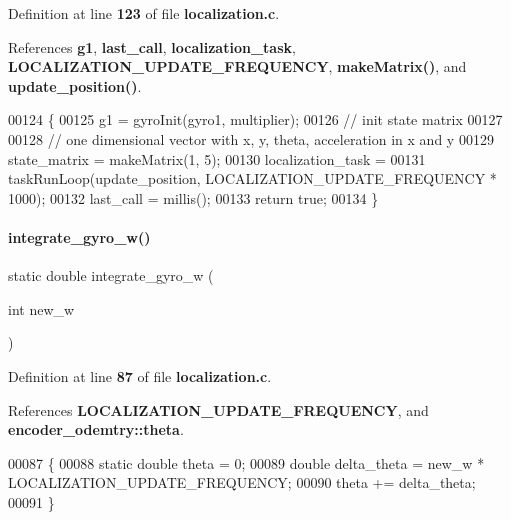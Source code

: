 Definition at line \textbf{ 123} of file \textbf{ localization.\+c}.



References \textbf{ g1}, \textbf{ last\+\_\+call}, \textbf{ localization\+\_\+task}, \textbf{ L\+O\+C\+A\+L\+I\+Z\+A\+T\+I\+O\+N\+\_\+\+U\+P\+D\+A\+T\+E\+\_\+\+F\+R\+E\+Q\+U\+E\+N\+CY}, \textbf{ make\+Matrix()}, and \textbf{ update\+\_\+position()}.


\begin{DoxyCode}
00124                                                                   \{
00125   g1 = gyroInit(gyro1, multiplier);
00126   \textcolor{comment}{// init state matrix}
00127 
00128   \textcolor{comment}{// one dimensional vector with x, y, theta, acceleration in x and y}
00129   state_matrix = makeMatrix(1, 5);
00130   localization_task =
00131       taskRunLoop(update_position, LOCALIZATION_UPDATE_FREQUENCY * 1000);
00132   last_call = millis();
00133   \textcolor{keywordflow}{return} \textcolor{keyword}{true};
00134 \}
\end{DoxyCode}
\mbox{\label{a00119_ac103fff038e59ff45f292b9b5138182e}} 
\paragraph{integrate\+\_\+gyro\+\_\+w()}
{\footnotesize\ttfamily static double integrate\+\_\+gyro\+\_\+w (\begin{DoxyParamCaption}\item[{int}]{new\+\_\+w }\end{DoxyParamCaption})\hspace{0.3cm}{\ttfamily [static]}}



Definition at line \textbf{ 87} of file \textbf{ localization.\+c}.



References \textbf{ L\+O\+C\+A\+L\+I\+Z\+A\+T\+I\+O\+N\+\_\+\+U\+P\+D\+A\+T\+E\+\_\+\+F\+R\+E\+Q\+U\+E\+N\+CY}, and \textbf{ encoder\+\_\+odemtry\+::theta}.


\begin{DoxyCode}
00087                                           \{
00088   \textcolor{keyword}{static} \textcolor{keywordtype}{double} theta = 0;
00089   \textcolor{keywordtype}{double} delta\_theta = new\_w * LOCALIZATION_UPDATE_FREQUENCY;
00090   theta += delta\_theta;
00091 \}
\end{DoxyCode}
\mbox{\label{a00119_afacd5e0b3d5e677df26a4402bbd9ec9e}} 
